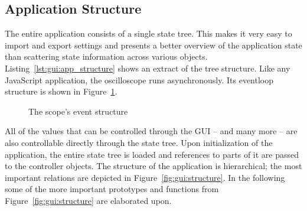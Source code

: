 %
%

\subsection{Application Structure} %
\label{subsec:gui:application_structure}


The  entire   application  consists  of   a  single  state   tree. This  makes
it  very   easy  to  import  and   export  settings  and  presents   a  better
overview  of   the  application   state  than  scattering   state  information
across   various   objects.   Listing~\ref{lst:gui:app_structure}   shows   an
extract  of   the  tree   structure. Like  any  JavaScript   application,  the
oscilloscope  runs   asynchronously. Its  eventloop  structure  is   shown  in
Figure~\ref{fig:gui:eventstructure}.

\begin{figure}
    \centering
    
    \caption[Scope Event Structure]{%
        The scope's event structure
    }
    \label{fig:gui:eventstructure}
\end{figure}


All of the values  that can be controlled through the GUI --  and many more --
are  also controllable  directly through  the state  tree. Upon initialization
of  the  application, the  entire  state  tree  is  loaded and  references  to
parts  of it  are passed  to  the controller  objects.  The  structure of  the
application  is hierarchical;  the most  important relations  are depicted  in
Figure~\ref{fig:gui:structure}.  In  the following some of  the more important
prototypes  and functions  from Figure~\ref{fig:gui:structure}  are elaborated
upon.

